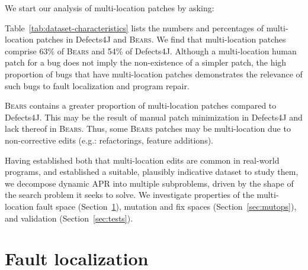 \documentclass[10pt,journal,compsoc]{IEEEtran}
\newcommand\bears{\textsc{Bears}\xspace}
\begin{document}
We start our analysis of multi-location patches by asking:


Table~\ref{tab:dataset-characteristics} lists the numbers and percentages of
multi-location patches in Defects4J and \bears. 
We find that multi-location patches comprise 63\% of \bears and 54\% of 
Defects4J.
Although a multi-location human patch for a bug does not imply the 
non-existence of a simpler patch, the high proportion of bugs that have 
multi-location patches demonstrates the relevance of such bugs to fault localization and
program repair. 

\bears contains a greater proportion of 
multi-location patches compared to Defects4J. This may be the 
result of manual patch minimization in Defects4J
and lack thereof in \bears.
Thus, some \bears patches may be multi-location due to
non-corrective edits (e.g.: refactorings, feature additions).

Having established both that multi-location edits are common in real-world
programs, and established a suitable, plausibly indicative dataset to study
them, we decompose dynamic APR into multiple subproblems, driven by the
shape of the search problem it seeks to solve. We 
investigate properties of the multi-location fault space (Section~\ref{secFL}),
mutation and fix spaces (Section~\ref{sec:mutops}), and validation
(Section~\ref{sec:tests}). 

\section{Fault localization} \label{secFL}

\end{document}
